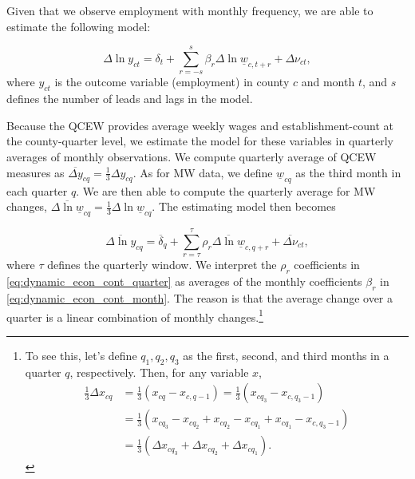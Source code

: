 Given that we observe employment with monthly frequency, we are able to estimate the following 
model:

\begin{equation} \label{eq:dynamic_econ_cont_month}
\Delta \ln y_{ct} = \delta_{t} 
+ \sum_{r=-s}^{s} \beta_r \Delta \ln \underline{w}_{c,t+r} 
+ \Delta \nu_{ct} ,
\end{equation}
where $y_{ct}$ is the outcome variable (employment) in county $c$ and month $t$, and $s$ defines 
the number of leads and lags in the model.

Because the QCEW provides average weekly wages and establishment-count at the county-quarter level, 
we estimate the model for these variables in quarterly averages of monthly observations. We compute 
quarterly average of QCEW measures as $\overline{\Delta y}_{cq} = \frac{1}{3} \Delta y_{cq}$. As for 
MW data, we define $\underline{w}_{cq}$ as the third month in each quarter $q$. We are then able to 
compute the quarterly average for MW changes, $\overline{\Delta \ln \underline{w}}_{cq} = \frac{1}{3} 
\Delta \ln \underline{w}_{cq}$. The estimating model then becomes

\begin{equation} \label{eq:dynamic_econ_cont_quarter}
\overline{\Delta \ln y}_{cq} = \overline{\delta}_q 
+ \sum_{r=\tau}^{\tau} \rho_r \overline{\Delta \ln \underline{w}}_{c,q+r}
+ \overline{\Delta \nu}_{ct} ,
\end{equation}
where $\tau$ defines the quarterly window. We interpret the $\rho_r$ coefficients in 
\autoref{eq:dynamic_econ_cont_quarter} as averages of the monthly coefficients $\beta_r$ in 
\autoref{eq:dynamic_econ_cont_month}. The reason is that the average change over a quarter is a 
linear combination of monthly changes.\footnote{To see this, let's define $q_1, q_2, q_3$ as the 
	first, second, and third months in a quarter $q$, respectively. Then, for any variable $x$,
	\begin{equation*}
	\begin{split}
	\frac{1}{3}\Delta x_{cq} 
	& = \frac{1}{3} \left( x_{cq} - x_{c,q-1} \right) 
	= \frac{1}{3} \left( x_{cq_3} - x_{c,q_3-1} \right) \\
	& = \frac{1}{3} \left( x_{cq_3} - x_{cq_2} 
	+ x_{cq_2} - x_{cq_1} + x_{cq_1} - x_{c,q_3-1} \right) \\ 
	& = \frac{1}{3} \left( \Delta x_{cq_3} + \Delta x_{cq_2}  + \Delta x_{cq_1} \right) .
	\end{split}
	\end{equation*}}


